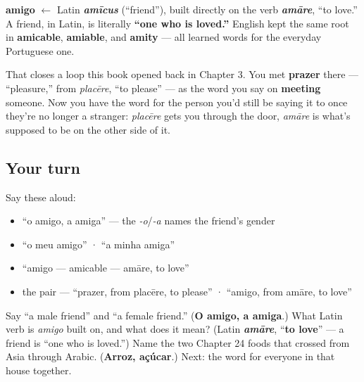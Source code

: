 \begin{cousinweb}
\textbf{amigo} $\leftarrow$ Latin \emph{\textbf{amīcus}} (\textquotedblleft{}friend\textquotedblright{}), built directly on the verb \emph{\textbf{amāre}}, \textquotedblleft{}to love.\textquotedblright{} A friend, in Latin, is literally \textbf{\textquotedblleft{}one who is loved.\textquotedblright{}} English kept the same root in \textbf{amicable}, \textbf{amiable}, and \textbf{amity} — all learned words for the everyday Portuguese one.

That closes a loop this book opened back in Chapter 3. You met \textbf{prazer} there — \textquotedblleft{}pleasure,\textquotedblright{} from \emph{placēre}, \textquotedblleft{}to please\textquotedblright{} — as the word you say on \textbf{meeting} someone. Now you have the word for the person you'd still be saying it to once they're no longer a stranger: \emph{placēre} gets you through the door, \emph{amāre} is what's supposed to be on the other side of it.
\end{cousinweb}

\subsection*{Your turn}
Say these aloud:

\begin{itemize}
\raggedright
  \item \textquotedblleft{}o amigo, a amiga\textquotedblright{} — the \emph{-o}/\emph{-a} names the friend's gender
  \item \textquotedblleft{}o meu amigo\textquotedblright{} · \textquotedblleft{}a minha amiga\textquotedblright{}
  \item \textquotedblleft{}amigo — amicable — amāre, to love\textquotedblright{}
  \item the pair — \textquotedblleft{}prazer, from placēre, to please\textquotedblright{} · \textquotedblleft{}amigo, from amāre, to love\textquotedblright{}
\end{itemize}

\begin{tcolorbox}[breakable,colback=teal!4,colframe=teal!35!black,title={Before you move on}]
Say \textquotedblleft{}a male friend\textquotedblright{} and \textquotedblleft{}a female friend.\textquotedblright{} (\textbf{O amigo, a amiga}.) What Latin verb is \emph{amigo} built on, and what does it mean? (Latin \emph{\textbf{amāre}}, \textquotedblleft{}\textbf{to love}\textquotedblright{} — a friend is \textquotedblleft{}one who is loved.\textquotedblright{}) Name the two Chapter 24 foods that crossed from Asia through Arabic. (\textbf{Arroz, açúcar}.) Next: the word for everyone in that house together.
\end{tcolorbox}
